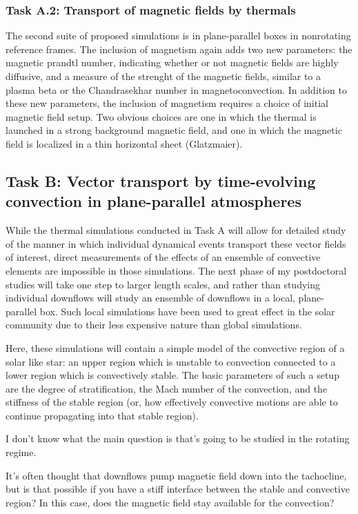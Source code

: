 \documentclass[aasms,12pt]{article}
\begin{document}
\subsubsection{Task A.2: Transport of magnetic fields by thermals}
The second suite of proposed simulations is in plane-parallel boxes in nonrotating reference frames.
The inclusion of magnetism again adds two new parameters: the magnetic prandtl number, indicating whether or not magnetic fields are highly diffusive, and a measure of the strenght of the magnetic fields, similar to a plasma beta or the Chandrasekhar number in magnetoconvection.
In addition to these new parameters, the inclusion of magnetism requires a choice of initial magnetic field setup.
Two obvious choices are one in which the thermal is launched in a strong background magnetic field, and one in which the magnetic field is localized in a thin horizontal sheet (Glatzmaier).

\subsection{Task B: Vector transport by time-evolving convection in plane-parallel atmospheres}
While the thermal simulations conducted in Task A will allow for detailed study of the manner in which individual dynamical events transport these vector fields of interest, direct measurements of the effects of an ensemble of convective elements are impossible in those simulations.
The next phase of my postdoctoral studies will take one step to larger length scales, and rather than studying individual downflows will study an ensemble of downflows in a local, plane-parallel box.
Such local simulations have been used to great effect in the solar community due to their less expensive nature than global simulations.

Here, these simulations will contain a simple model of the convective region of a solar like star: an upper region which is unstable to convection connected to a lower region which is convectively stable.
The basic parameters of such a setup are the degree of stratification, the Mach number of the convection, and the stiffness of the stable region (or, how effectively convective motions are able to continue propagating into that stable region).

I don't know what the main question is that's going to be studied in the rotating regime.

It's often thought that downflows pump magnetic field down into the tachocline, but is that possible if you have a stiff interface between the stable and convective region?
In this case, does the magnetic field stay available for the convection?
\end{document}
